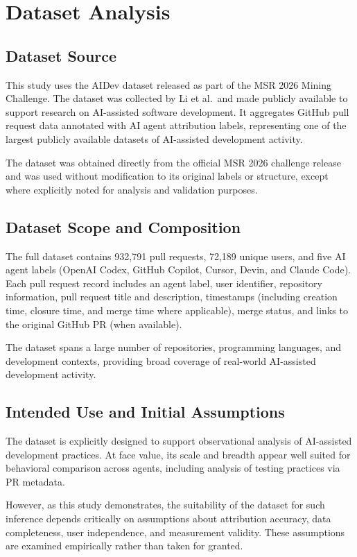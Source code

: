 \documentclass[conference]{IEEEtran}
\begin{document}
\section{Dataset Analysis}
\subsection{Dataset Source}
This study uses the AIDev dataset released as part of the MSR 2026 Mining Challenge. The dataset was collected by Li et al.\ and made publicly available to support research on AI-assisted software development. It aggregates GitHub pull request data annotated with AI agent attribution labels, representing one of the largest publicly available datasets of AI-assisted development activity.

The dataset was obtained directly from the official MSR 2026 challenge release and was used without modification to its original labels or structure, except where explicitly noted for analysis and validation purposes.

\subsection{Dataset Scope and Composition}
The full dataset contains 932,791 pull requests, 72,189 unique users, and five AI agent labels (OpenAI Codex, GitHub Copilot, Cursor, Devin, and Claude Code). Each pull request record includes an agent label, user identifier, repository information, pull request title and description, timestamps (including creation time, closure time, and merge time where applicable), merge status, and links to the original GitHub PR (when available).

The dataset spans a large number of repositories, programming languages, and development contexts, providing broad coverage of real-world AI-assisted development activity.


\subsection{Intended Use and Initial Assumptions}
The dataset is explicitly designed to support observational analysis of AI-assisted development practices. At face value, its scale and breadth appear well suited for behavioral comparison across agents, including analysis of testing practices via PR metadata.

However, as this study demonstrates, the suitability of the dataset for such inference depends critically on assumptions about attribution accuracy, data completeness, user independence, and measurement validity. These assumptions are examined empirically rather than taken for granted.
\end{document}
